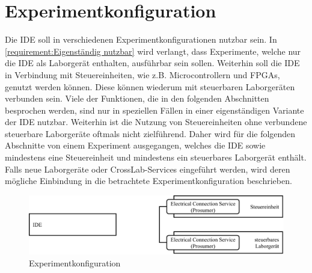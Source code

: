 \section{Experimentkonfiguration}\label{section:konzeption:experimentkonfiguration}

Die IDE soll in verschiedenen Experimentkonfigurationen nutzbar sein. In \autoref{requirement:Eigenständig nutzbar} wird verlangt, dass Experimente, welche nur die IDE als Laborgerät enthalten, ausführbar sein sollen. Weiterhin soll die IDE in Verbindung mit Steuereinheiten, wie z.B. Microcontrollern und FPGAs, genutzt werden können. Diese können wiederum mit steuerbaren Laborgeräten verbunden sein. Viele der Funktionen, die in den folgenden Abschnitten besprochen werden, sind nur in speziellen Fällen in einer eigenständigen Variante der IDE nutzbar. Weiterhin ist die Nutzung von Steuereinheiten ohne verbundene steuerbare Laborgeräte oftmals nicht zielführend. Daher wird für die folgenden Abschnitte von einem Experiment ausgegangen, welches die IDE sowie mindestens eine Steuereinheit und mindestens ein steuerbares Laborgerät enthält. Falls neue Laborgeräte oder CrossLab-Services eingeführt werden, wird deren mögliche Einbindung in die betrachtete Experimentkonfiguration beschrieben.

\begin{figure}[htbp]
    \centering
    \includegraphics[width=\textwidth]{diagrams/experimentkonfigurationen/Experimentkonfiguration-00.drawio.pdf}
    \caption{Experimentkonfiguration}
    \label{figure:experimentkonfiguration:basis}
\end{figure}